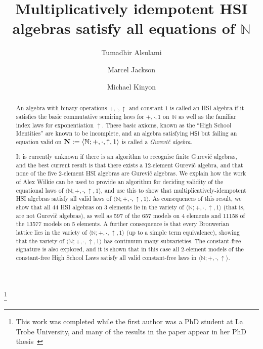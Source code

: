 \documentclass[eqnor,reqno]{amsart}
\theoremstyle{plain}
\theoremstyle{definition}
\newcommand{\HSI}{\textsf{HSI}}
\begin{document}
\title[]{Multiplicatively idempotent HSI algebras satisfy all equations of $\mathbb{N}$}
\author{Tumadhir Alsulami}
\address{Department of Mathematics, Umm Al-Qura University, Makkah, Saudi Arabia} 
\author{Marcel Jackson}
\address{Department of Mathematical and Physical Sciences, La Trobe University, Victoria  3086,
Australia} 
\author{Michael Kinyon}
\address{College of Natural Sciences and Mathematics, University of Denver} 




\thanks{This work was completed while the first author was a PhD student at La Trobe University, and many of the results in the paper appear in her PhD thesis~\cite{als:phd}}

\begin{abstract}
An algebra with binary operations $+,\cdot,\uparrow$ and constant $1$ is called an HSI algebra if it satisfies the basic commutative semiring laws for $+,\cdot,1$ on~$\mathbb{N}$ as well as the familiar index laws for exponentiation $\uparrow$.  
These basic axioms, known as the ``High School Identities'' are known to be incomplete, and an algebra satisfying $\HSI$ but failing an equation valid on ${\bf N}:=\langle \mathbb{N};+,\cdot,\uparrow,1\rangle$ is called a \emph{Gurevi\v{c} algebra}.

It is currently unknown if there is an algorithm to recognise finite Gurevi\v{c} algebras, and the best current result is that there exists a 12-element Gurevi\v{c} algebra, and that none of the five 2-element HSI algebras are Gurevi\v{c} algebras.  
We explain how the work of Alex Wilkie can be used to provide an algorithm for deciding validity of the equational laws of $\langle \mathbb{N};+,\cdot,\uparrow,1\rangle$, and use this to show that multiplicatively-idempotent HSI algebras satisfy all valid laws of $\langle \mathbb{N};+,\cdot,\uparrow,1\rangle$.
As consequences of this result, we show that all 44 HSI algebras on 3 elements lie in the variety of $\langle \mathbb{N};+,\cdot,\uparrow,1\rangle$ (that is, are not Gurevi\v{c} algebras), as well as 597 of the 657 models on 4 elements and 11158 of the 13577 models on 5 elements.  
A further consequence is that every Brouwerian lattice lies in the variety of $\langle \mathbb{N};+,\cdot,\uparrow,1\rangle$ (up to a simple term equivalence), showing that the variety of $\langle \mathbb{N};+,\cdot,\uparrow,1\rangle$ has continuum many subvarieties.
The constant-free signature is also explored, and it is shown that in this case all $2$-element models of the constant-free High School Laws satisfy all valid constant-free laws in $\langle \mathbb{N};+,\cdot,\uparrow\rangle$.
\end{abstract}
\end{document}
